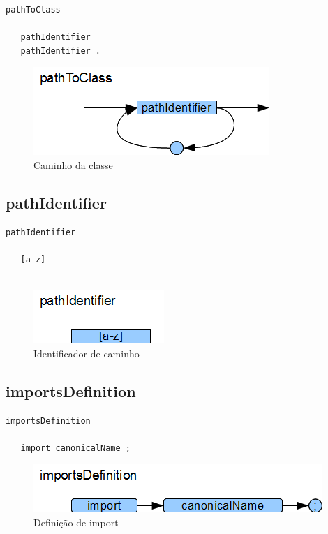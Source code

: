 \begin{lstlisting}
pathToClass

   pathIdentifier
   pathIdentifier . 
\end{lstlisting}

\begin{figure}[h!]
 \centering
 \includegraphics{capitulo09/pathToClass.png}
 \caption{Caminho da classe}
\end{figure}
\subsection{pathIdentifier}

\begin{lstlisting}
pathIdentifier

   [a-z]
	
\end{lstlisting}

\begin{figure}[h!]
 \centering
 \includegraphics{capitulo09/pathIdentifier.png}
 \caption{Identificador de caminho}
\end{figure}
\subsection{importsDefinition}

\begin{lstlisting}
importsDefinition

   import canonicalName ;

\end{lstlisting}

\begin{figure}[h!]
 \centering
 \includegraphics{capitulo09/importsDefinition.png}
 \caption{Definição de import}
\end{figure}
